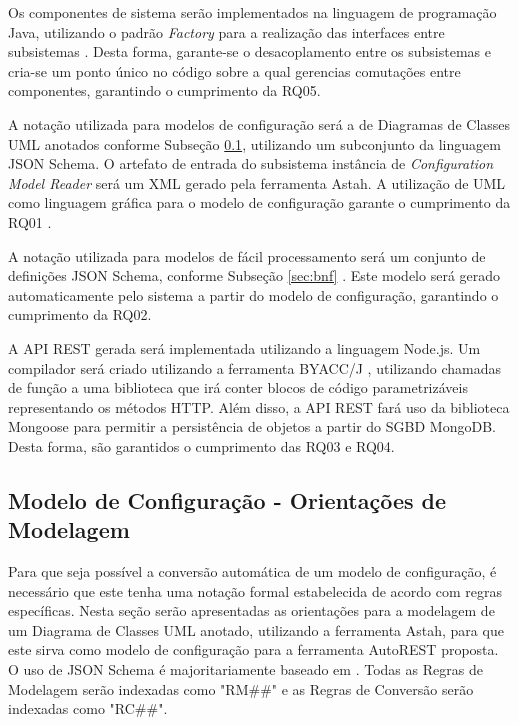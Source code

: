 Os componentes de sistema serão implementados na linguagem de programação Java, utilizando o padrão \textit{Factory} \cite{GAMMA:1995} para a realização das interfaces entre subsistemas \cite{LASER:2015}. Desta forma, garante-se o desacoplamento entre os subsistemas e cria-se um ponto único no código sobre a qual gerencias comutações entre componentes, garantindo o cumprimento da RQ05.

A notação utilizada para modelos de configuração será a de Diagramas de Classes UML anotados conforme Subseção \ref{sec:xmi}, utilizando um subconjunto da linguagem JSON Schema. O artefato de entrada do subsistema instância de \textit{Configuration Model Reader} será um XML gerado pela ferramenta Astah. A utilização de UML como linguagem gráfica para o modelo de configuração garante o cumprimento da RQ01 \cite{OMG:2011}.

A notação utilizada para modelos de fácil processamento será um conjunto de definições JSON Schema, conforme Subseção \ref{sec:bnf} \cite{PEZOA:2016}. Este modelo será gerado automaticamente pelo sistema a partir do modelo de configuração, garantindo o cumprimento da RQ02.

A API REST gerada será implementada utilizando a linguagem Node.js. Um compilador será criado utilizando a ferramenta BYACC/J \cite{BYACCJ}, utilizando chamadas de função a uma biblioteca que irá conter blocos de código parametrizáveis representando os métodos HTTP. Além disso, a API REST fará uso da biblioteca Mongoose para permitir a persistência de objetos a partir do SGBD MongoDB. Desta forma, são garantidos o cumprimento das RQ03 e RQ04.


\subsection{Modelo de Configuração - Orientações de Modelagem}
\label{sec:xmi}

Para que seja possível a conversão automática de um modelo de configuração, é necessário que este tenha uma notação formal estabelecida de acordo com regras específicas. Nesta seção serão apresentadas as orientações para a modelagem de um Diagrama de Classes UML anotado, utilizando a ferramenta Astah, para que este sirva como modelo de configuração para a ferramenta AutoREST proposta. O uso de JSON Schema é majoritariamente baseado em . Todas as Regras de Modelagem serão indexadas como "RM\#\#" e as Regras de Conversão serão indexadas como "RC\#\#".

